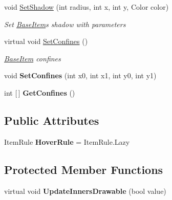 \begin{DoxyCompactItemize}
void \mbox{\hyperlink{class_space_v_i_l_1_1_base_item_adaa4c47dddc52af32bf6bfba6bd85f9f}{Set\+Shadow}} (int radius, int x, int y, Color color)
\begin{DoxyCompactList}\small\item\em Set \mbox{\hyperlink{class_space_v_i_l_1_1_base_item}{Base\+Item}}\textquotesingle{}s shadow with parameters \end{DoxyCompactList}\item 
virtual void \mbox{\hyperlink{class_space_v_i_l_1_1_base_item_abb2566ee1b68d0e415d003fcb252ca70}{Set\+Confines}} ()
\begin{DoxyCompactList}\small\item\em \mbox{\hyperlink{class_space_v_i_l_1_1_base_item}{Base\+Item}} confines \end{DoxyCompactList}\item 
\mbox{\label{class_space_v_i_l_1_1_base_item_a8b0345fd4a7b73f7bf3310bd80861620}} 
void {\bfseries Set\+Confines} (int x0, int x1, int y0, int y1)
\item 
\mbox{\label{class_space_v_i_l_1_1_base_item_aa49650ca1911b9fa60e6a2ea9e8a3f34}} 
int \mbox{[}$\,$\mbox{]} {\bfseries Get\+Confines} ()
\end{DoxyCompactItemize}
\subsection*{Public Attributes}
\begin{DoxyCompactItemize}
\item 
\mbox{\label{class_space_v_i_l_1_1_base_item_accc863c17c2b80aa9170686b5a0d9f66}} 
Item\+Rule {\bfseries Hover\+Rule} = Item\+Rule.\+Lazy
\end{DoxyCompactItemize}
\subsection*{Protected Member Functions}
\begin{DoxyCompactItemize}
\item 
\mbox{\label{class_space_v_i_l_1_1_base_item_a6283f17a4100c1c334469b81f6b3c6d4}} 
virtual void {\bfseries Update\+Inners\+Drawable} (bool value)
\end{DoxyCompactItemize}


